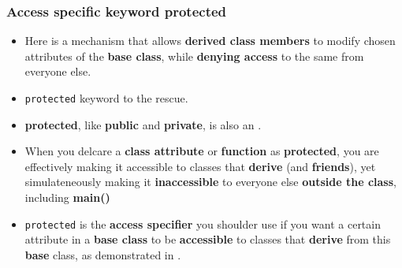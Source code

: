 \documentclass[10pt]{article}
\newcommand{\pbreak}{\vspace{30pt}}
\newcommand{\vocab}[1]{\fbox{\textbf{\textit{#1}}}}
\begin{document}
\newpage

\subsubsection{Access specific keyword protected}
\begin{itemize}
	\item Here is a mechanism that allows \textbf{derived class members} to modify chosen attributes of the \textbf{base class}, while \textbf{denying access} to the same from everyone else.
	\item \verb|protected| keyword to the rescue.
\end{itemize}

\begin{tcolorbox}
	\begin{itemize}
		\item \textbf{protected}, like \textbf{public} and \textbf{private}, is also an \vocab{access specifier}.

	\item When you delcare a \textbf{class attribute} or \textbf{function} as \textbf{protected}, you are effectively making it accessible to classes that \textbf{derive} (and \textbf{friends}), yet simulateneously making it \textbf{inaccessible} to everyone else \textbf{outside the class}, including \textbf{main()}
	\end{itemize}
\end{tcolorbox}

\pbreak

\begin{itemize}
	\item \verb|protected| is the \textbf{access specifier} you shoulder use if you want a certain attribute in a \textbf{base class} to be \textbf{accessible} to classes that \textbf{derive} from this \textbf{base} class, as demonstrated in .
\end{itemize}

\newpage 
\end{document}
